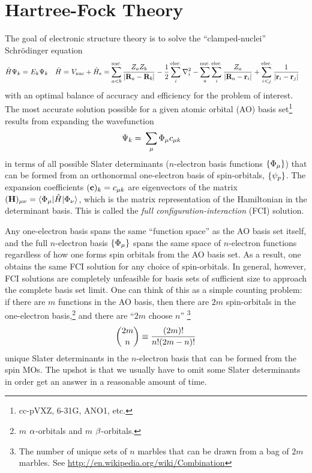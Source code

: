\documentclass[11pt]{article}
\numberwithin{equation}{section}
\begin{document}
\section{Hartree-Fock Theory}

The goal of electronic structure theory is to solve the ``clamped-nuclei'' Schr\"odinger equation
\begin{align}
\label{eq:electronic-schrodinger-equation}
	\hat{H}\Psi _k
=&\
	E_k\Psi _k
&
  \hat{H}
=&\
  V_{\mathrm{nuc}}
+
	\hat{H}_e
=
  \sum_{a<b}^{\text{nuc.}}
	\frac {Z_aZ_b}{|\mathbf{R}_a-\mathbf{R}_b|}
-
  \frac {1}{2}
  \sum_i^{\text{elec.}}
	\nabla_i^2
-
  \sum_a^{\text{nuc.}}
  \sum_i^{\text{elec.}}
	\frac {Z_a}{|\mathbf{R}_a-\mathbf{r}_i|}
+
  \sum_{i<j}^{\text{elec.}}
	\frac {1}{|\mathbf{r}_i-\mathbf{r}_j|}
\end{align}
with an optimal balance of accuracy and efficiency for the problem of interest.
The most accurate solution possible for a given atomic orbital (AO) basis set\footnote{cc-pVXZ, 6-31G, ANO1, etc.} results from expanding the wavefunction
\begin{align}
\label{eq:full-ci-wavefunction-expansion}
	\Y_k
=&\
	\sum_\mu
	\F_\mu c_{\mu k}
\end{align}
in terms of all possible Slater determinants ($n$-electron basis functions $\{\F_\mu\}$) that can be formed from an orthonormal one-electron basis of spin-orbitals, $\{\psi _p\}$.
The expansion coefficients $(\bo{c})_k=c_{\mu k}$ are eigenvectors of the matrix $(\bo{H})_{\mu\nu}=\ip{\F_\mu|\op{H}|\F_\nu}$, which is the matrix representation of the Hamiltonian in the determinant basis.
This is called the {\it full configuration-interaction} (FCI) solution.

Any one-electron basis spans the same ``function space'' as the AO basis set itself, and the full $n$-electron basis $\{\F_\mu\}$ spans the same space of $n$-electron functions regardless of how one forms spin orbitals from the AO basis set.
As a result, one obtains the same FCI solution for any choice of spin-orbitals.
In general, however, FCI solutions are completely unfeasible for basis sets of sufficient size to approach the complete basis set limit.
One can think of this as a simple counting problem: if there are $m$ functions in the AO basis, then there are $2m$ spin-orbitals in the one-electron basis,\footnote{$m$ $\alpha $-orbitals and $m$ $\beta $-orbitals.} and there are ``$2m$ choose $n$'' \footnote{The number of unique sets of $n$ marbles that can be drawn from a bag of $2m$ marbles.  See \url{http://en.wikipedia.org/wiki/Combination}}
\begin{align*}
{2m \choose n}\equiv\frac {(2m)!}{n!(2m-n)!}
\end{align*}
unique Slater determinants in the $n$-electron basis that can be formed from the spin MOs.
The upshot is that we usually have to omit some Slater determinants in order get an answer in a reasonable amount of time.
\end{document}
